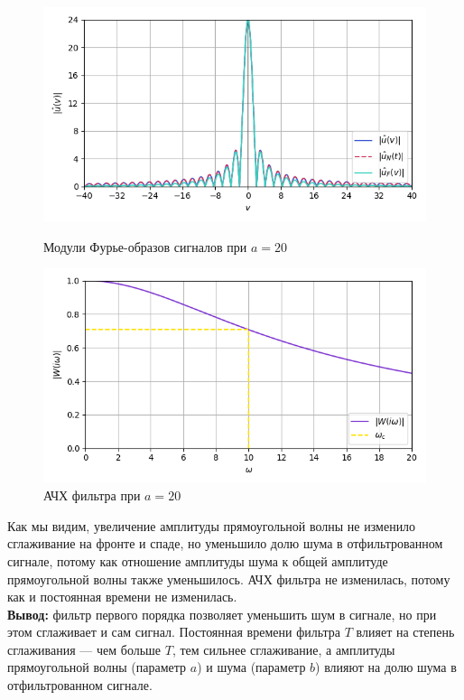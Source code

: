 \documentclass[a4paper]{article}
\begin{document}
\begin{figure}[H]
    \begin{minipage}{0.49\textwidth}
        \centering \includegraphics[width=\textwidth]{sources/second/part1/a=20 T=0.1/2_fft_cmp.png}
        \caption{Модули Фурье-образов сигналов при $a = 20$}
    \end{minipage}\hfill
    \begin{minipage}{0.49\textwidth}
        \centering \includegraphics[width=\textwidth]{sources/second/part1/a=20 T=0.1/3_filter.png}
        \caption{АЧХ фильтра при $a = 20$}
    \end{minipage}
\end{figure}
Как мы видим, увеличение амплитуды прямоугольной волны не изменило сглаживание на фронте и спаде, но уменьшило долю шума в отфильтрованном сигнале, потому как отношение амплитуды шума к общей амплитуде прямоугольной волны также уменьшилось. АЧХ фильтра не изменилась, потому как и постоянная времени не изменилась.\\[0.5em]
\textbf{Вывод:} фильтр первого порядка позволяет уменьшить шум в сигнале, но при этом сглаживает и сам сигнал. Постоянная времени фильтра $T$ влияет на степень сглаживания --- чем больше $T$, тем сильнее сглаживание, а амплитуды прямоугольной волны (параметр $a$) и шума (параметр $b$) влияют на долю шума в отфильтрованном сигнале.
\end{document}
